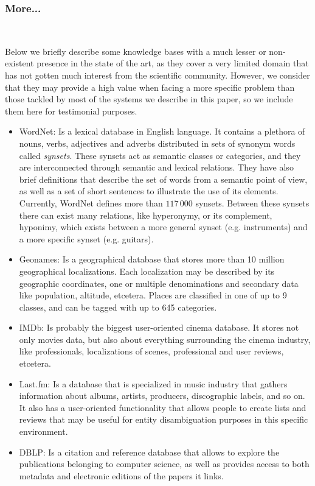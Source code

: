 \subsubsection{More...}~

Below we briefly describe some knowledge bases with a much lesser or non-existent presence in the state of the art, as they cover a very limited domain that has not gotten much interest from the scientific community. However, we consider that they may provide a high value when facing a more specific problem than those tackled by most of the systems we describe in this paper, so we include them here for testimonial purposes.

\begin{itemize}
\item WordNet: Is a lexical database in English language. It contains a plethora of nouns, verbs, adjectives and adverbs distributed in sets of synonym words called \emph{synsets}. These synsets act as semantic classes or categories, and they are interconnected through semantic and lexical relations. They have also brief definitions that describe the set of words from a semantic point of view, as well as a set of short sentences to illustrate the use of its elements. Currently, WordNet defines more than $117\,000$ synsets. Between these synsets there can exist many relations, like hyperonymy, or its complement, hyponimy, which exists between a more general synset (e.g. instruments) and a more specific synset (e.g. guitars).
\item Geonames: Is a geographical database that stores more than 10 million geographical localizations. Each localization may be described by its geographic coordinates, one or multiple denominations and secondary data like population, altitude, etcetera. Places are classified in one of up to 9 classes, and can be tagged with up to 645 categories.
\item IMDb: Is probably the biggest user-oriented cinema database. It stores not only movies data, but also about everything surrounding the cinema industry, like professionals, localizations of scenes, professional and user reviews, etcetera.
\item Last.fm: Is a database that is specialized in music industry that gathers information about albums, artists, producers, discographic labels, and so on. It also has a user-oriented functionality that allows people to create lists and reviews that may be useful for entity disambiguation purposes in this specific environment.
\item DBLP: Is a citation and reference database that allows to explore the publications belonging to computer science, as well as provides access to both metadata and electronic editions of the papers it links.
\end{itemize}














